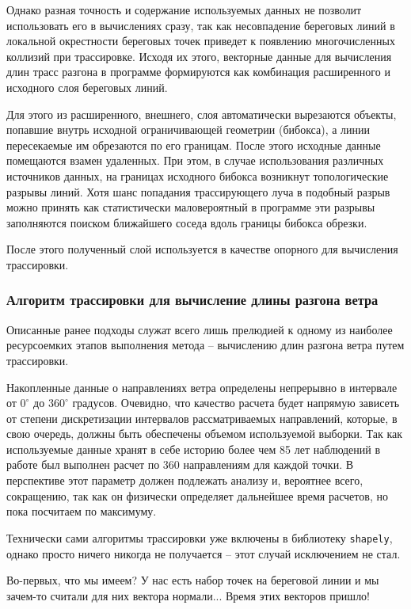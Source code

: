 Однако разная точность и содержание используемых данных не позволит использовать его в вычислениях сразу, так как несовпадение береговых линий в локальной окрестности береговых точек приведет к появлению многочисленных коллизий при трассировке.
Исходя их этого, векторные данные для вычисления длин трасс разгона в программе формируются как комбинация расширенного и исходного слоя береговых линий.

Для этого из расширенного, внешнего, слоя автоматически вырезаются объекты, попавшие внутрь исходной ограничивающей геометрии (бибокса), а линии пересекаемые им обрезаются по его границам.
После этого исходные данные помещаются взамен удаленных.
При этом, в случае использования различных источников данных, на границах исходного бибокса возникнут топологические разрывы линий.
Хотя шанс попадания трассирующего луча в подобный разрыв можно принять как статистически маловероятный в программе эти разрывы заполняются поиском ближайшего соседа вдоль границы бибокса обрезки.

После этого полученный слой используется в качестве опорного для вычисления трассировки.

\subsubsection{Алгоритм трассировки для вычисление длины разгона ветра}

Описанные ранее подходы служат всего лишь прелюдией к одному из наиболее ресурсоемких этапов выполнения метода -- вычислению длин разгона ветра путем трассировки.

Накопленные данные о направлениях ветра определены непрерывно в интервале от $0^\circ$ до $360^\circ$ градусов.
Очевидно, что качество расчета будет напрямую зависеть от степени дискретизации интервалов рассматриваемых направлений, которые, в свою очередь, должны быть обеспечены объемом используемой выборки.
Так как используемые данные хранят в себе историю более чем 85 лет наблюдений в работе был выполнен расчет по 360 направлениям для каждой точки.
В перспективе этот параметр должен подлежать анализу и, вероятнее всего, сокращению, так как он физически определяет дальнейшее время расчетов, но пока посчитаем по максимуму.

Технически сами алгоритмы трассировки уже включены в библиотеку \texttt{shapely}, однако просто ничего никогда не получается -- этот случай исключением не стал.

Во-первых, что мы имеем?
У нас есть набор точек на береговой линии и мы зачем-то считали для них вектора нормали...
Время этих векторов пришло!

